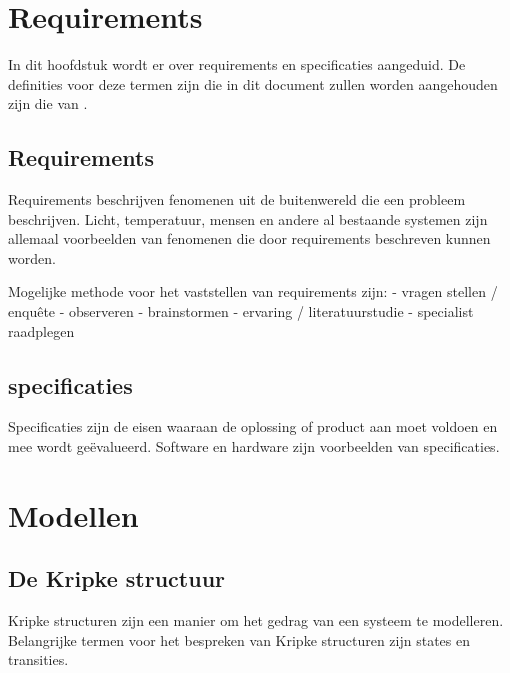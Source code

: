 \documentclass{article}
\begin{document}
\section{Requirements}

In dit hoofdstuk wordt er over requirements en specificaties aangeduid. De definities voor deze termen zijn die in dit document zullen worden aangehouden zijn die van \cite{thompson2000requirements}. \newline

\subsection{Requirements}

Requirements beschrijven fenomenen uit de buitenwereld die een probleem beschrijven. \newline \newline
Licht, temperatuur, mensen en andere al bestaande systemen zijn allemaal voorbeelden van fenomenen die door requirements beschreven kunnen worden. \newline

Mogelijke methode voor het vaststellen van requirements zijn: \newline
- vragen stellen / enquête \newline
- observeren \newline
- brainstormen \newline
- ervaring / literatuurstudie \newline
- specialist raadplegen \newline


\subsection{specificaties}

Specificaties zijn de eisen waaraan de oplossing of product aan moet voldoen en mee wordt geëvalueerd. Software en hardware zijn voorbeelden van specificaties.

\section{Modellen}

\subsection{De Kripke structuur}

Kripke structuren zijn een manier om het gedrag van een systeem te modelleren. Belangrijke termen voor het bespreken van Kripke structuren zijn states en transities. \newline
\end{document}
